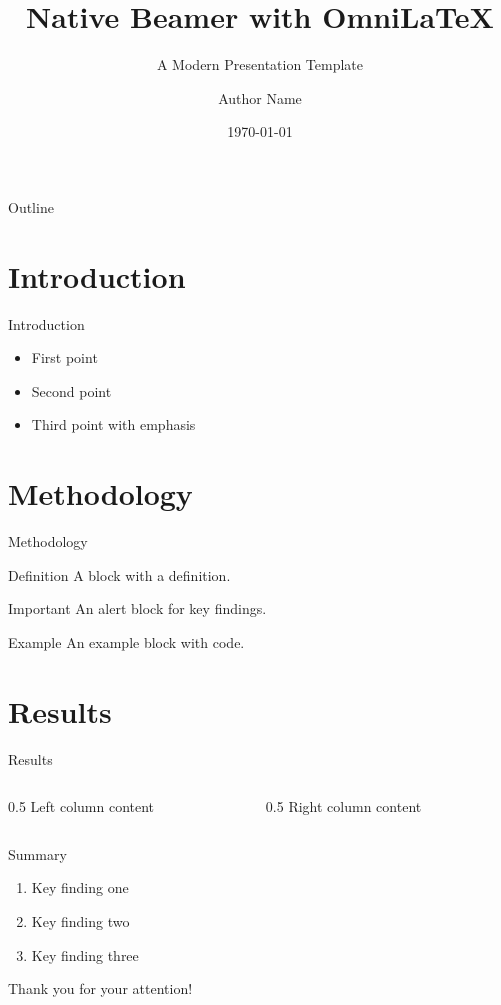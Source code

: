 \documentclass[
  doctype=beamer,
  language=english,
  beameraspectratio=169,
]{omnilatex}
\title{Native Beamer with OmniLaTeX}
\subtitle{A Modern Presentation Template}
\author{Author Name}
\date{\today}
\begin{document}
\begin{frame}
  \titlepage
\end{frame}

\begin{frame}{Outline}
  \tableofcontents
\end{frame}

\section{Introduction}

\begin{frame}{Introduction}
  \begin{itemize}
    \item First point
    \item Second point
    \item Third point with \alert{emphasis}
  \end{itemize}
\end{frame}

\section{Methodology}

\begin{frame}{Methodology}
  \begin{block}{Definition}
    A block with a definition.
  \end{block}
  \begin{alertblock}{Important}
    An alert block for key findings.
  \end{alertblock}
  \begin{exampleblock}{Example}
    An example block with code.
  \end{exampleblock}
\end{frame}

\section{Results}

\begin{frame}{Results}
  \begin{columns}
    \begin{column}{0.5\textwidth}
      Left column content
    \end{column}
    \begin{column}{0.5\textwidth}
      Right column content
    \end{column}
  \end{columns}
\end{frame}

\begin{frame}{Summary}
  \begin{enumerate}
    \item Key finding one
    \item Key finding two
    \item Key finding three
  \end{enumerate}
  \vfill
  \centering
  Thank you for your attention!
\end{frame}
\end{document}
